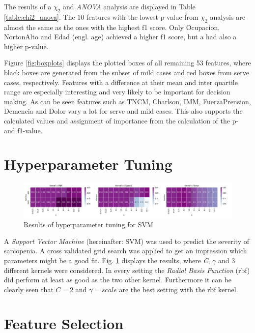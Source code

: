 \documentclass[11pt]{article}
\begin{document}
The results of a $\chi_2$ and \emph{ANOVA} analysis are displayed in Table \ref{table:chi2_anova}. The 10 features with the lowest p-value from $\chi_2$ analysis are almost the same as the ones with the highest f1 score. Only Ocupacion, NortonAlto and Edad (engl. age) achieved a higher f1 score, but a had also a higher p-value.


Figure \ref{fig:boxplots} displays the plotted boxes of all remaining 53 features, where black boxes are generated from the subset of mild cases and red boxes from serve cases, respectively. Features with a difference at their mean and inter quartile range are especially interesting and very likely to be important for decision making. As can be seen features such as TNCM, Charlson, IMM, FuerzaPrension, Demencia and Dolor vary a lot for serve and mild cases. This also supports the calculated values and assignment of importance from the calculation of the p- and f1-value.

\section{Hyperparameter Tuning}
\begin{figure}[t]
\includegraphics[width=\linewidth]{heatmap_svc_hyperparameter.png}
\caption{Results of hyperparameter tuning for SVM}
\label{fig:hyper_svc}
\end{figure}

A \emph{Support Vector Machine} (hereinafter: SVM) was used to predict the severity of sarcopenia. A cross validated grid search was applied to get an impression which parameters might be a good fit. Fig. \ref{fig:hyper_svc} displays the results, where \emph{C}, $\gamma$ and 3 different kernels were considered. In every setting the \emph{Radial Basis Function} (rbf) did perform at least as good as the two other kernel. Furthermore it can be clearly seen that $C=2$ and $\gamma=scale$ are the best setting with the rbf kernel.

\section{Feature Selection}



\printbibliography[heading=bibintoc, title={References}]
\end{document}

